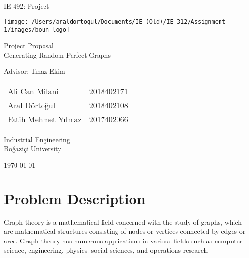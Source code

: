 \documentclass[12pt, oneside, a4paper]{article}
\begin{document}
\begin{titlepage}
    \begin{center}
            
        \LARGE
        IE 492: Project
            
        \vspace{1cm}
        \texttt{[image: /Users/araldortogul/Documents/IE (Old)/IE 312/Assignment 1/images/boun-logo]}
        
        Project Proposal\\[0.3cm]
        \huge
        Generating Random Perfect Graphs
        
        \vspace{0.5cm}
        \LARGE
        Advisor: Tınaz Ekim
        
            
        \vfill
        
        \begin{table}[h]
        \centering
        \Large
        \begin{tabular}{p{6.5cm}r}
        Ali Can Milani & 2018402171 \\
        Aral Dörtoğul & 2018402108 \\
        Fatih Mehmet Yılmaz & 2017402066
        \end{tabular}
        \end{table}
            
        \vfill
            
        \large
        Industrial Engineering\\
        Boğaziçi University
        
        \vspace{0.8cm}

        \today
            
    \end{center}
\end{titlepage}

\newpage


\section{Problem Description}

Graph theory is a mathematical field concerned with the study of graphs, which are mathematical structures consisting of nodes or vertices connected by edges or arcs. Graph theory has numerous applications in various fields such as computer science, engineering, physics, social sciences, and operations research.
\end{document}
